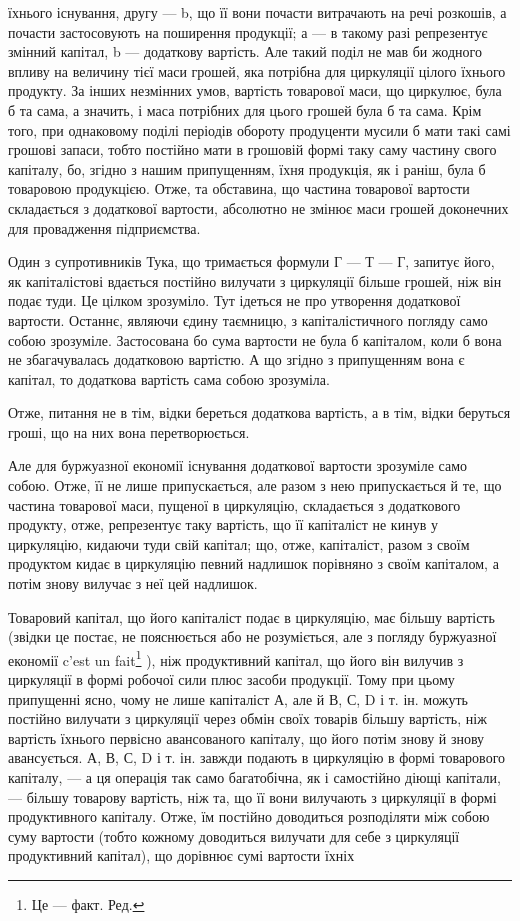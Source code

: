 їхнього існування, другу — b, що її вони почасти витрачають на речі
розкошів, а почасти застосовують на поширення продукції; а — в такому
разі репрезентує змінний капітал, b — додаткову вартість. Але такий поділ
не мав би жодного впливу на величину тієї маси грошей, яка потрібна
для циркуляції цілого їхнього продукту. За інших незмінних умов, вартість
товарової маси, що циркулює, була б та сама, а значить, і маса
потрібних для цього грошей була б та сама. Крім того, при однаковому
поділі періодів обороту продуценти мусили б мати такі самі грошові запаси,
тобто постійно мати в грошовій формі таку саму частину свого
капіталу, бо, згідно з нашим припущенням, їхня продукція, як і раніш,
була б товаровою продукцією. Отже, та обставина, що частина товарової
вартости складається з додаткової вартости, абсолютно не змінює маси
грошей доконечних для провадження підприємства.

Один з супротивників Тука, що тримається формули Г — Т — Г, запитує
його, як капіталістові вдається постійно вилучати з циркуляції більше
грошей, ніж він подає туди. Це цілком зрозуміло. Тут ідеться не про
утворення додаткової вартости. Останнє, являючи єдину таємницю, з
капіталістичного погляду само собою зрозуміле. Застосована бо сума вартости
не була б капіталом, коли б вона не збагачувалась додатковою
вартістю. А що згідно з припущенням вона є капітал, то додаткова вартість
сама собою зрозуміла.

Отже, питання не в тім, відки береться додаткова вартість, а в тім,
відки беруться гроші, що на них вона перетворюється.

Але для буржуазної економії існування додаткової вартости зрозуміле
само собою. Отже, її не лише припускається, але разом з нею припускається
й те, що частина товарової маси, пущеної в циркуляцію, складається
з додаткового продукту, отже, репрезентує таку вартість, що її капіталіст
не кинув у циркуляцію, кидаючи туди свій капітал; що, отже, капіталіст,
разом з своїм продуктом кидає в циркуляцію певний надлишок
порівняно з своїм капіталом, а потім знову вилучає з неї цей надлишок.

Товаровий капітал, що його капіталіст подає в циркуляцію, має більшу
вартість (звідки це постає, не пояснюється або не розуміється, але з
погляду буржуазної економії c’est un fait\footnote*{
Це — факт. Ред.
} ), ніж продуктивний капітал,
що його він вилучив з циркуляції в формі робочої сили плюс засоби
продукції. Тому при цьому припущенні ясно, чому не лише капіталіст
А, але й В, С, D і т. ін. можуть постійно вилучати з циркуляції через
обмін своїх товарів більшу вартість, ніж вартість їхнього первісно авансованого
капіталу, що його потім знову й знову авансується. А, В, С,
D і т. ін. завжди подають в циркуляцію в формі товарового капіталу, —
а ця операція так само багатобічна, як і самостійно діющі капітали, —
більшу товарову вартість, ніж та, що її вони вилучають з циркуляції в
формі продуктивного капіталу. Отже, їм постійно доводиться розподіляти
між собою суму вартости (тобто кожному доводиться вилучати для себе
з циркуляції продуктивний капітал), що дорівнює сумі вартости їхніх